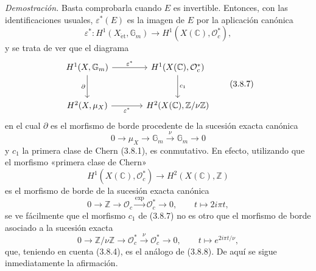\emph{Demostración.} Basta comprobarla cuando $E$ es invertible. Entonces, con las identificaciones usuales, $\varepsilon^*(E)$ es la imagen de $E$ por la aplicación canónica
\[
\varepsilon^*:H^1(X_{\mathrm{\acute et}},\mathbb G_m)\to H^1(X(\mathbb C),\mathcal O_c^*),
\tag{3.8.6}
\]
y se trata de ver que el diagrama
\[
\begin{tikzcd}[column sep=large,row sep=large]
H^1(X,\mathbb G_m) \arrow[r,"\varepsilon^*"] \arrow[d,"\partial"'] &
H^1(X(\mathbb C),\mathcal O_c^*) \arrow[d,"c_1"]\\
H^2(X,\mu_X) \arrow[r,"\varepsilon^*"'] &
H^2(X(\mathbb C),\mathbb Z/\nu\mathbb Z)
\end{tikzcd}
\tag{3.8.7}
\]
en el cual $\partial$ es el morfismo de borde procedente de la sucesión exacta canónica
\[
0\to \mu_X\to\mathbb G_m\xrightarrow{\nu}\mathbb G_m\to0
\tag{3.8.8}
\]
y $c_1$ la primera clase de Chern (3.8.1), es conmutativo. En efecto, utilizando que el morfismo «primera clase de Chern»
\[
H^1(X(\mathbb C),\mathcal O_c^*)\to H^2(X(\mathbb C),\mathbb Z)
\]
es el morfismo de borde de la sucesión exacta canónica
\[
0\to\mathbb Z\to\mathcal O_c\xrightarrow{\exp}\mathcal O_c^*\to0,
\qquad
t\mapsto 2i\pi t,
\]
se ve fácilmente que el morfismo $c_1$ de (3.8.7) no es otro que el morfismo de borde asociado a la sucesión exacta
\[
0\to\mathbb Z/\nu\mathbb Z\to\mathcal O_c^*\xrightarrow{\nu}\mathcal O_c^*\to0,
\qquad
t\mapsto e^{2i\pi t/\nu},
\]
que, teniendo en cuenta (3.8.4), es el análogo de (3.8.8). De aquí se sigue inmediatamente la afirmación.
